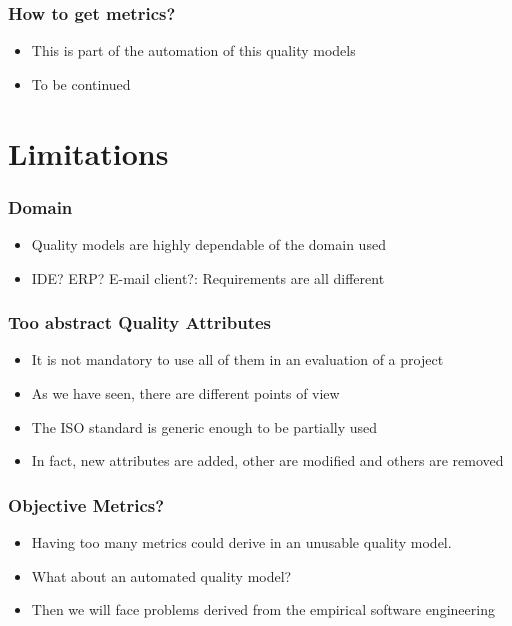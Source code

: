\documentclass{beamer}
\begin{document}
\begin{frame}
\frametitle{How to get metrics?}
\begin{center}
\begin{itemize}
 \item This is part of the automation of this quality models
 \item To be continued
\end{itemize}
\end{center}
\end{frame}


\section{Limitations}

\begin{frame}
\frametitle{Domain}
\begin{center}
\begin{itemize}
 \item Quality models are highly dependable of the domain used
 \item IDE? ERP? E-mail client?: Requirements are all different
\end{itemize}
\end{center}
\end{frame}


\begin{frame}
\frametitle{Too abstract Quality Attributes}
\begin{center}
\begin{itemize}
 \item It is not mandatory to use all of them in an evaluation of a project
 \item As we have seen, there are different points of view
 \item The ISO standard is generic enough to be partially used
 \item In fact, new attributes are added, other are modified and others are removed
\end{itemize}
\end{center}
\end{frame}


\begin{frame}
\frametitle{Objective Metrics?}
\begin{center}
\begin{itemize}
 \item Having too many metrics could derive in an unusable quality model.
 \item What about an automated quality model?
 \item Then we will face problems derived from the empirical software engineering
\end{itemize}
\end{center}
\end{frame}
\end{document}
